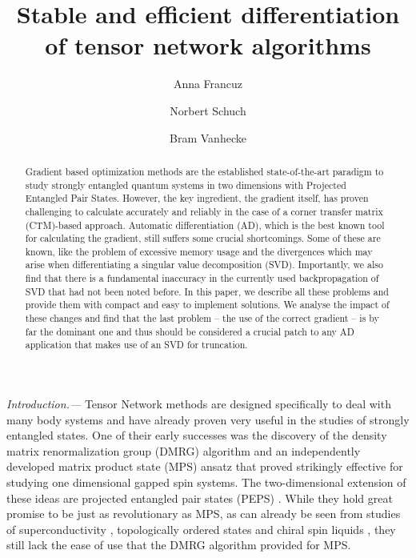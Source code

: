 \documentclass[twocolumn,floatfix,superscriptaddress,longbibliography,pra]{revtex4-2}
\renewcommand{\section}[1]{\emph{#1.---}}
\begin{document}
\title{Stable and efficient differentiation of tensor network algorithms}
\author{Anna Francuz}
\author{Norbert Schuch}
\author{Bram Vanhecke}



\begin{abstract}
Gradient based optimization methods are the established state-of-the-art paradigm to study strongly entangled quantum systems in two dimensions with Projected Entangled Pair States. However, the key ingredient, the gradient itself, has proven challenging to calculate accurately and reliably in the case of a corner transfer matrix (CTM)-based approach. Automatic differentiation (AD), which is the best known tool for calculating the gradient, still suffers some crucial shortcomings. Some of these are known, like the problem of excessive memory usage 
and the divergences which may arise when differentiating a singular value decomposition (SVD). Importantly, we also find that there is a fundamental inaccuracy in the currently used 
backpropagation of SVD that had not been noted before. In this paper, we describe all these problems and provide them with compact and easy to implement solutions. We analyse the impact of these changes and find that the last problem -- the use of the correct gradient -- is by far the dominant one and thus should be considered a crucial patch to any AD application that makes use of an SVD for truncation. 
\end{abstract}

\maketitle
\section{Introduction}%
Tensor Network methods are designed specifically to deal with many body systems and have already proven very useful in the studies of strongly entangled states. One of their early successes was the discovery of the density matrix renormalization group (DMRG) algorithm \cite{DMRG1,DMRG2} and an independently developed matrix product state (MPS) ansatz \cite{MPS1,MPS2} that proved strikingly effective for studying one dimensional gapped spin systems. 
The two-dimensional extension of these ideas are projected entangled pair states (PEPS) \cite{PEPS}. While they hold great promise to be just as revolutionary as MPS, as can already be seen from studies of superconductivity \cite{Corboz_Hubbard,fermions3,iPEPS_tJ,vPEPS_tJ}, topologically ordered states \cite{topoAF1,topo_Corboz} and chiral spin liquids \cite{Juraj_CSL}, they still lack the ease of use that the DMRG algorithm provided for MPS. 
\end{document}
